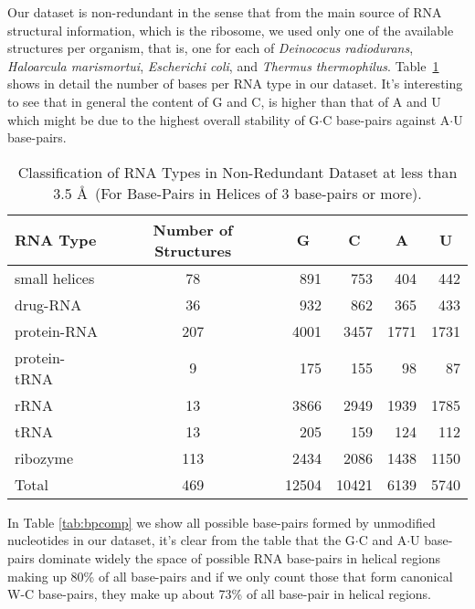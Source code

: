 Our dataset is  non-redundant in the sense that  from the main source
of RNA structural information, which is the ribosome, we used only one
of the  available structures  per organism, that  is, one for  each of
\textit{Deinococus   radiodurans},   \textit{Haloarcula  marismortui},
\textit{Escherichi          coli},         and         \textit{Thermus
  thermophilus}. Table~\ref{tab:dbase}  shows in detail  the number of
bases per  RNA type in  our dataset. It's  interesting to see  that in
general the content of  G and C, is higher than that  of A and U which
might be due to the  highest overall stability of G$\cdot$C base-pairs
against A$\cdot$U base-pairs.
\begin{table}[H]
\begin{center}
\begin{tabular}{|l|c|r|r|r|r|}
\hline
RNA Type & \multicolumn{1}{p{2cm}|}{Number of Structures} & \multicolumn{1}{c|}{G} &
\multicolumn{1}{c|}{C} & \multicolumn{1}{c|}{A} &
\multicolumn{1}{c|}{U} \\ \hline \hline
small helices & 78 & 891 & 753 & 404 & 442 \\ \hline
drug-RNA & 36 & 932 & 862 & 365 & 433 \\ \hline
protein-RNA & 207 & 4001 & 3457 & 1771 & 1731 \\ \hline
protein-tRNA & 9 & 175 & 155 & 98 & 87 \\ \hline
rRNA & 13 & 3866 & 2949 & 1939 & 1785 \\ \hline
tRNA & 13 & 205 & 159 & 124 & 112 \\ \hline
ribozyme & 113 & 2434 & 2086 & 1438 & 1150 \\ \hline
Total & 469 & \multicolumn{1}{c|}{12504} & \multicolumn{1}{c|}{10421} & \multicolumn{1}{c|}{6139} & \multicolumn{1}{c|}{5740} \\ \hline
\end{tabular}
\caption{Classification of RNA Types in Non-Redundant Dataset at less
  than 3.5 \AA~(For Base-Pairs in Helices of 3 base-pairs or more).}
\label{tab:dbase}
\end{center}
\end{table}

In Table  \ref{tab:bpcomp} we show  all possible base-pairs  formed by
unmodified nucleotides in our dataset,  it's clear from the table that
the G$\cdot$C  and A$\cdot$U base-pairs  dominate widely the  space of
possible  RNA base-pairs  in helical  regions  making up  80\% of  all
base-pairs  and  if  we  only  count those  that  form  canonical  W-C
base-pairs, they make up about 73\% of all base-pair in helical regions.

